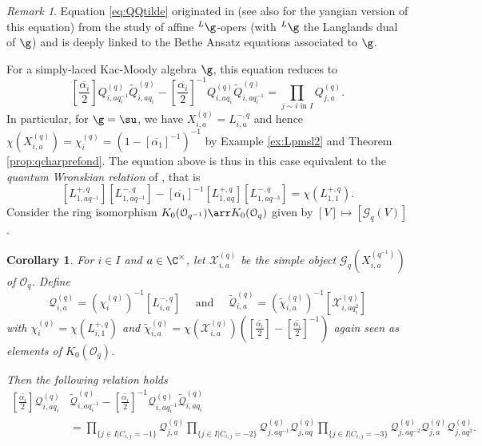 \documentclass[11pt]{amsart}
\newtheorem{cor}[theorem]{Corollary}
\theoremstyle{definition}
\theoremstyle{remark}
\newtheorem{rem}[theorem]{Remark}
\numberwithin{equation}{section}
\begin{document}
\begin{rem} Equation \eqref{eq:QQtilde} originated in \cite{mrv1,mrv2} (see also \cite{mv1,mv2} for the yangian version of this equation) from the study of affine ${}^L\g$-opers (with ${}^L\g$ the Langlands dual of $\g$) and is deeply linked to the Bethe Ansatz equations associated to $\g$.
\end{rem} For a simply-laced Kac-Moody algebra $\g$, this equation reduces to
$$ {\textstyle \left[\overline{\frac{\alpha_i}{2}}\right]}Q_{i,aq_i^{-1}}^{(q)}\tilde{Q}_{i,aq_i}^{(q)}-{\textstyle \left[\overline{\frac{\alpha_i}{2}}\right]^{-1}}Q_{i,aq_i}^{(q)}\tilde{Q}_{i,aq_i^{-1}}^{(q)} = \prod_{j\sim i \text{ in } I} Q_{j,a}^{(q)}.$$
In particular, for $\g = \su$, we have $X_{i,a}^{(q)} = L_{i,a}^{-,q}$ and hence $\chi(X_{i,a}^{(q)}) = \chi_i^{(q)} = (1-[\overline{\alpha_1}]^{-1})^{-1}$ by Example \ref{ex:Lpmsl2} and Theorem \ref{prop:qcharprefond}. The equation above is thus in this case equivalent to the \textit{quantum Wronskian relation} of \cite{blz}, that is $$ [L_{1,aq^{-1}}^{+,q}][L_{1,aq^{-1}}^{-,q}]-[\overline{\alpha_1}]^{-1}[L_{1,aq}^{+,q}][L_{1,aq^{-3}}^{-,q}] = \chi(L_{1,1}^{+,q}).$$
Consider the ring isomorphism $K_0(\mathcal{O}_{q^{-1}}) \arr K_0(\mathcal{O}_q)$ given by $[V]\mapsto [\mathcal{G}_q(V)]$. 
\begin{cor}\label{cor:QQtilde2} For $i\in I$ and $a\in \C^{\times}$, let $\mathcal{X}_{i,a}^{(q)}$ be the simple object $\mathcal{G}_q (X_{i,a}^{(q^{-1})})$ of $\mathcal{O}_q$. Define
$$ \mathcal{Q}_{i,a}^{(q)} = (\chi_i^{(q)})^{-1}[L_{i,a}^{-,q}] \quad\text{ and }\quad \tilde{\mathcal{Q}}_{i,a}^{(q)} = (\widetilde{\chi}_{i,a}^{(q)})^{-1}[\mathcal{X}_{i,aq_i^2}^{(q)}]$$
with 
$\chi_i^{(q)}=\chi(L_{i,1}^{+,q})$ and $\widetilde{\chi}_{i,a}^{(q)}=\chi(\mathcal{X}_{i,a}^{(q)})\left(\textstyle \left[\overline{\frac{\alpha_i}{2}}\right]-\left[\overline{\frac{\alpha_i}{2}}\right]^{-1}\right)$ again seen as elements of $K_0(\mathcal{O}_q)$.\par\noindent Then the following relation holds
\begin{align}\label{eq:QQtilde2}
{\textstyle \left[\overline{\frac{\alpha_i}{2}}\right]}\mathcal{Q}_{i,aq_i}^{(q)}&\tilde{\mathcal{Q}}_{i,aq_i^{-1}}^{(q)}-{\textstyle\left[\overline{\frac{\alpha_i}{2}}\right]}^{-1}\mathcal{Q}_{i,aq_i^{-1}}^{(q)}\tilde{\mathcal{Q}}_{i,aq_i}^{(q)} \\&= \prod_{\{j\in I|C_{i,j}=-1\}}\mathcal{Q}_{j,a}^{(q)}\prod_{\{j\in I|C_{i,j}=-2\}}\mathcal{Q}_{j,aq^{-1}}^{(q)}\mathcal{Q}_{j,aq}^{(q)}\prod_{\{j\in I|C_{i,j}=-3\}}\mathcal{Q}_{j,aq^{-2}}^{(q)}\mathcal{Q}_{j,a}^{(q)}\mathcal{Q}_{j,aq^2}^{(q)}.\nonumber
\end{align}
\end{cor}
\end{document}
